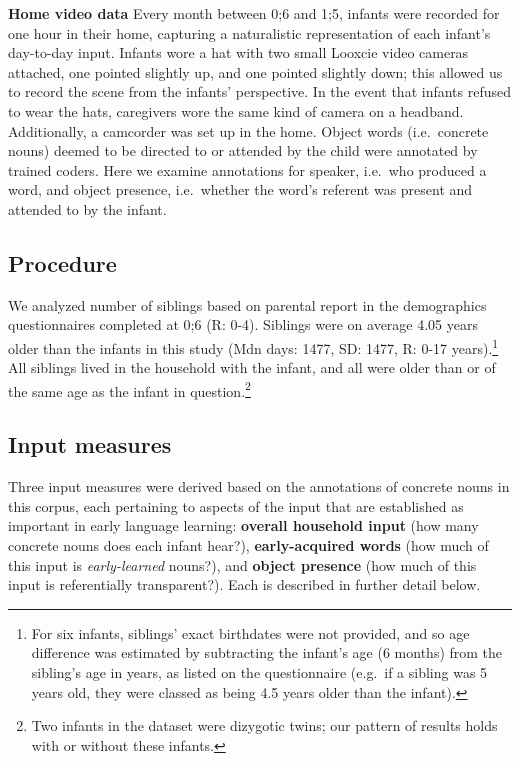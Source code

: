 \documentclass[
  english,
  man,floatsintext]{apa6}
\begin{document}
\textbf{Home video data} Every month between 0;6 and 1;5, infants were recorded for one hour in their home, capturing a naturalistic representation of each infant's day-to-day input. Infants wore a hat with two small Looxcie video cameras attached, one pointed slightly up, and one pointed slightly down; this allowed us to record the scene from the infants' perspective. In the event that infants refused to wear the hats, caregivers wore the same kind of camera on a headband. Additionally, a camcorder was set up in the home. Object words (i.e.~concrete nouns) deemed to be directed to or attended by the child were annotated by trained coders. Here we examine annotations for speaker, i.e.~who produced a word, and object presence, i.e.~whether the word's referent was present and attended to by the infant.

\hypertarget{procedure}{%
\subsection{Procedure}\label{procedure}}

We analyzed number of siblings based on parental report in the demographics questionnaires completed at 0;6 (R: 0-4). Siblings were on average 4.05 years older than the infants in this study (Mdn days: 1477, SD: 1477, R: 0-17 years).\footnote{For six infants, siblings' exact birthdates were not provided, and so age difference was estimated by subtracting the infant's age (6 months) from the sibling's age in years, as listed on the questionnaire (e.g.~if a sibling was 5 years old, they were classed as being 4.5 years older than the infant).} All siblings lived in the household with the infant, and all were older than or of the same age as the infant in question.\footnote{Two infants in the dataset were dizygotic twins; our pattern of results holds with or without these infants.}

\hypertarget{input-measures}{%
\subsection{Input measures}\label{input-measures}}

Three input measures were derived based on the annotations of concrete nouns in this corpus, each pertaining to aspects of the input that are established as important in early language learning: \textbf{overall household input} (how many concrete nouns does each infant hear?), \textbf{early-acquired words} (how much of this input is \emph{early-learned} nouns?), and \textbf{object presence} (how much of this input is referentially transparent?). Each is described in further detail below.
\end{document}

